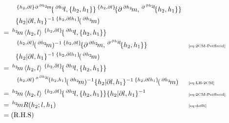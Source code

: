 \documentclass[11pt, reqno]{amsart} %
\newcommand{\act}[1]{\,\sp{#1}\!}
\theoremstyle{definition}
\theoremstyle{remark}
\numberwithin{equation}{section}
\begin{document}
\begin{align*}
  &\qquad 
  \act{\{h_2,\partial l\}}\act{\partial \act{\partial h_2}m}\{\act{\partial h_2}l,\{h_2,h_1\}\}\act{\{h_2,\partial l\}}\{\partial \act{\partial h_2}m,\act{\partial \act{\partial h_2}l}\{h_2,h_1\}\} \\
  &\qquad 
  \{h_2|\partial l,h_1\}^{-1}
  \act{\{h_2,\partial lh_1\}}(\act{\partial h_2}m) \\
  &= 
  \act{h_2}m\left<h_2,l\right>\act{\{h_2,\partial l\}}\{\act{\partial h_2}l,\{h_2,h_1\}\} \\
  &\qquad 
  \act{\{h_2,\partial l\}}(\act{\partial h_2}m)^{-1}\act{\{h_2,\partial l\}}\{\partial \act{\partial h_2}m,\act{\partial \act{\partial h_2}l}\{h_2,h_1\}\} & &\text{\tiny \eqref{eq:2CM-Peifferid}} \\
  &\qquad 
  \{h_2|\partial l,h_1\}^{-1}
  \act{\{h_2,\partial lh_1\}}(\act{\partial h_2}m) \\
  &= 
  \act{h_2}m\left<h_2,l\right>\act{\{h_2,\partial l\}}\{\act{\partial h_2}l,\{h_2,h_1\}\} \\
  &\qquad 
  \act{\{h_2,\partial l\}\act{\partial \act{\partial h_2}l}\{h_2,h_1\}}(\act{\partial h_2}m)^{-1}
  \{h_2|\partial l,h_1\}^{-1}
  \act{\{h_2,\partial lh_1\}}(\act{\partial h_2}m) & &\text{\tiny \eqref{eq:LH-2CM}} \\
  &= 
  \act{h_2}m\left<h_2,l\right>\act{\{h_2,\partial l\}}\{\act{\partial h_2}l,\{h_2,h_1\}\}\{h_2|\partial l,h_1\}^{-1} & &\text{\tiny \eqref{eq:2CM-Peifferid}} \\
  &= \act{h_2}mR(h_2;l,h_1) & &\text{\tiny \eqref{eq:defR}} \\
  &= \text{(R.H.S)}
\end{align*}
\end{document}
